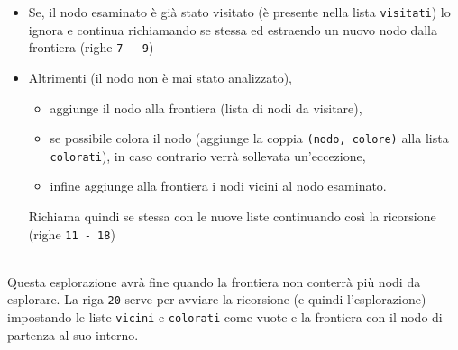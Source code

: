\begin{itemize}
	\item Se, il nodo esaminato è già stato visitato (è presente nella lista \lstinline[style=cmd]|visitati|) lo ignora e continua richiamando se stessa ed estraendo un nuovo nodo dalla frontiera (righe \lstinline[style=cmd]|7 - 9|)
	\item Altrimenti (il nodo non è mai stato analizzato), 
		\begin{itemize}
			\item aggiunge il nodo alla frontiera (lista di nodi da visitare),
			\item se possibile colora il nodo (aggiunge la coppia \lstinline[style=cmd]|(nodo, colore)| alla lista \lstinline[style=cmd]|colorati|), in caso contrario verrà sollevata un'eccezione, 
			\item infine aggiunge alla frontiera i nodi vicini al nodo esaminato. 
		\end{itemize}
	Richiama quindi se stessa con le nuove liste continuando così la ricorsione (righe \lstinline[style=cmd]|11 - 18|)
\end{itemize}
\ \\
Questa esplorazione avrà fine quando la frontiera non conterrà più nodi da esplorare.
La riga \lstinline[style=cmd]|20| serve per avviare la ricorsione (e quindi l'esplorazione) impostando le liste \lstinline[style=cmd]|vicini| e \lstinline[style=cmd]|colorati| come vuote e la frontiera con il nodo di partenza al suo interno. \\

